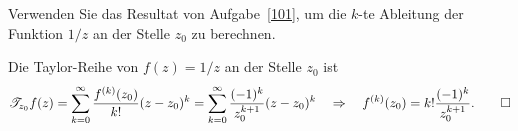 Verwenden Sie das Resultat von Aufgabe~\ref{101}, um die $k$-te Ableitung
der Funktion $1/z$ an der Stelle $z_0$ zu berechnen.

\begin{loesung}
Die Taylor-Reihe von $f(z)=1/z$ an der Stelle $z_0$ ist
\[
\mathscr{T}_{z_0}f(z)
=
\sum_{k=0}^\infty
\frac{f^{(k)}(z_0)}{k!}
(z-z_0)^k
=
\sum_{k=0}^\infty
\frac{(-1)^k}{z_0^{k+1}} (z-z_0)^k
\quad\Rightarrow\quad
f^{(k)}(z_0)
=
k!\frac{(-1)^k}{z_0^{k+1}}.
\qedhere
\]
\end{loesung}

